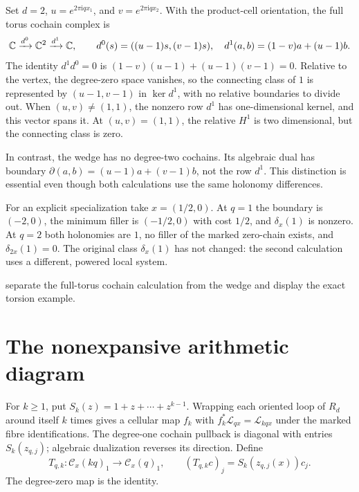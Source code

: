 \documentclass[11pt,a4paper]{article}
\begin{document}
\begin{example}
\label{ex:two-dimensional}
Set $d=2$, $u=e^{2\pi\mathrm i qx_1}$, and
$v=e^{2\pi\mathrm i qx_2}$.  With the product-cell orientation, the full
torus cochain complex is
\[
 \mathbb C\xrightarrow{d^0}\mathbb C^2\xrightarrow{d^1}\mathbb C,
 \qquad
 d^0(s)=((u-1)s,(v-1)s),\quad
 d^1(a,b)=(1-v)a+(u-1)b.
\]
The identity $d^1d^0=0$ is
$(1-v)(u-1)+(u-1)(v-1)=0$.  Relative to the vertex, the degree-zero
space vanishes, so the connecting class of $1$ is represented by
$(u-1,v-1)$ in $\ker d^1$, with no relative boundaries to divide out.
When $(u,v)\ne(1,1)$, the nonzero row $d^1$ has one-dimensional kernel,
and this vector spans it.  At $(u,v)=(1,1)$, the relative $H^1$ is
two dimensional, but the connecting class is zero.

In contrast, the wedge has no degree-two cochains.  Its algebraic dual
has boundary $\partial(a,b)=(u-1)a+(v-1)b$, not the row $d^1$.
This distinction is essential even though both calculations use the same
holonomy differences.

For an explicit specialization take $x=(1/2,0)$.  At $q=1$ the boundary
is $(-2,0)$, the minimum filler is $(-1/2,0)$ with cost $1/2$, and
$\delta_x(1)$ is nonzero.  At $q=2$ both holonomies are $1$, no filler
of the marked zero-chain exists, and $\delta_{2x}(1)=0$.  The original
class $\delta_x(1)$ has not changed: the second calculation uses a
different, powered local system.
\end{example}

 separate the full-torus
cochain calculation from the wedge and display the exact torsion example.



\section{The nonexpansive arithmetic diagram}
\label{sec:diagram}

For $k\geq1$, put $S_k(z)=1+z+\cdots+z^{k-1}$.  Wrapping each oriented
loop of $R_d$ around itself $k$ times gives a cellular map $f_k$ with
$f_k^*\mathcal L_{qx}=\mathcal L_{kqx}$ under the marked fibre
identifications.  The degree-one cochain pullback is diagonal with entries
$S_k(z_{q,j})$; algebraic dualization reverses its direction.  Define
\begin{equation}\label{eq:arithmetic-map}
 T_{q,k}:\mathcal C_x(kq)_1\longrightarrow\mathcal C_x(q)_1,
 \qquad (T_{q,k}c)_j=S_k(z_{q,j}(x))c_j.
\end{equation}
The degree-zero map is the identity.
\end{document}
